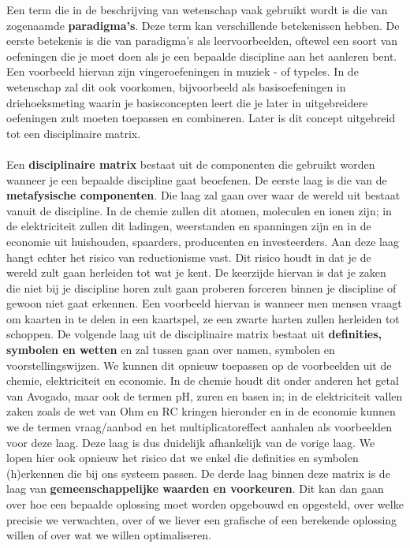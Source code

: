 \documentclass[../summary.tex]{subfiles}
\begin{document}
	Een term die in de beschrijving van wetenschap vaak gebruikt wordt is die van zogenaamde \textbf{paradigma's}. Deze term kan verschillende betekenissen hebben. De eerste betekenis is die van paradigma's als leervoorbeelden, oftewel een soort van oefeningen die je moet doen als je een bepaalde discipline aan het aanleren bent. Een voorbeeld hiervan zijn vingeroefeningen in muziek - of typeles. In de wetenschap zal dit ook voorkomen, bijvoorbeeld als basisoefeningen in driehoeksmeting waarin je basisconcepten leert die je later in uitgebreidere oefeningen zult moeten toepassen en combineren. Later is dit concept uitgebreid tot een disciplinaire matrix.
	\\\\
	Een \textbf{disciplinaire matrix} bestaat uit de componenten die gebruikt worden wanneer je een bepaalde discipline gaat beoefenen. De eerste laag is die van de \textbf{metafysische componenten}. Die laag zal gaan over waar de wereld uit bestaat vanuit de discipline. In de chemie zullen dit atomen, moleculen en ionen zijn; in de elektriciteit zullen dit ladingen, weerstanden en spanningen zijn en in de economie uit huishouden, spaarders, producenten en investeerders. Aan deze laag hangt echter het risico van reductionisme vast. Dit risico houdt in dat je de wereld zult gaan herleiden tot wat je kent. De keerzijde hiervan is dat je zaken die niet bij je discipline horen zult gaan proberen forceren binnen je discipline of gewoon niet gaat erkennen. Een voorbeeld hiervan is wanneer men mensen vraagt om kaarten in te delen in een kaartspel, ze een zwarte harten zullen herleiden tot schoppen. 
	De volgende laag uit de disciplinaire matrix bestaat uit \textbf{definities, symbolen en wetten} en zal tussen gaan over namen, symbolen en voorstellingswijzen. We kunnen dit opnieuw toepassen op de voorbeelden uit de chemie, elektriciteit en economie. In de chemie houdt dit onder anderen het getal van Avogado, maar ook de termen pH, zuren en basen in; in de elektriciteit vallen zaken zoals de wet van Ohm en RC kringen hieronder en in de economie kunnen we de termen vraag/aanbod en het multiplicatoreffect aanhalen als voorbeelden voor deze laag. Deze laag is dus duidelijk afhankelijk van de vorige laag. We lopen hier ook opnieuw het risico dat we enkel die definities en symbolen (h)erkennen die bij ons systeem passen. 
	De derde laag binnen deze matrix is de laag van \textbf{gemeenschappelijke waarden en voorkeuren}. Dit kan dan gaan over hoe een bepaalde oplossing moet worden opgebouwd en opgesteld, over welke precisie we verwachten, over of we liever een grafische of een berekende oplossing willen of over wat we willen optimaliseren. 
\end{document}
